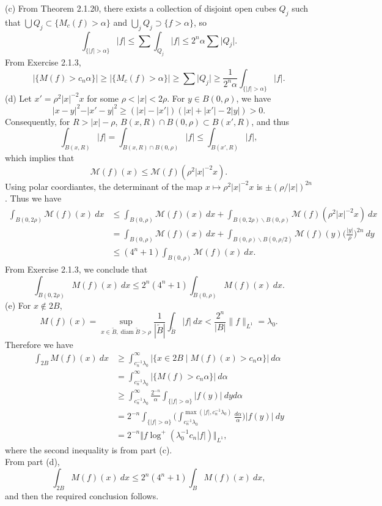 \begin{itemize}
(c) From Theorem 2.1.20, there exists a collection of disjoint open cubes $Q_j$ such that 
$\bigcup Q_j\subset\{M_c(f)>\alpha\}$ and $\bigcup_jQ_j\supset\{f>\alpha\}$, so
$$\int_{\{\vert f\vert>\alpha\}}\vert f\vert\leq\sum\int_{Q_j}\vert f\vert\leq 2^n\alpha\sum\vert Q_j\vert.$$
From Exercise 2.1.3,
$$\vert\{M(f)>c_n\alpha\}\vert\geq \vert\{M_c(f)>\alpha\}\vert
\geq \sum\vert Q_j\vert\geq\frac{1}{2^n\alpha}\int_{\{\vert f\vert>\alpha\}}\vert f\vert.$$
(d) Let $x'=\rho^2\vert x\vert^{-2}x$ for some $\rho<|x|<2\rho$. 
For $y\in B(0,\rho)$, we have $$\vert x-y\vert^2-\vert x'-y\vert ^2
\geq(|x|-|x'|)(|x|+|x'|-2|y|)>0.$$ 
Consequently, for $R>\vert x\vert-\rho$, $B(x,R)\cap B(0,\rho)
\subset B(x',R)$, and thus
$$\int_{B(x,R)}\vert f\vert=\int_{B(x,R)\cap B(0,\rho)}\vert f\vert 
\leq \int_{B(x',R)}\vert f\vert,$$
which implies that 
$$\mathcal{M}(f)(x)\leq\mathcal{M}(f)(\rho^2\vert x\vert^{-2}x).$$
Using polar coordiantes, the determinant of the map $x\mapsto
\rho^2\vert x\vert^{-2}x$ is $\pm(\rho/\vert x\vert)^{2n}$. Thus we have
\begin{align*}
\int_{B(0,2\rho)}\mathcal{M}(f)(x)\>dx
&\leq \int_{B(0,\rho)}\mathcal{M}(f)(x)\>dx+\int_{B(0,2\rho)\backslash B(0,\rho)}\mathcal{M}(f)(\rho^2|x|^{-2}x)\>dx\\
&=\int_{B(0,\rho)}\mathcal{M}(f)(x)\>dx+\int_{B(0,\rho)\backslash B(0,\rho/2)}\mathcal{M}(f)(y)\Big(\frac{|y|}{\rho}\Big)^{2n}\>dy\\
&\leq (4^n+1)\int_{B(0,\rho)}\mathcal{M}(f)(x)\>dx.
\end{align*}
From Exercise 2.1.3, we conclude that 
$$\int_{B(0,2\rho)}M(f)(x)\>dx\leq2^n(4^n+1)\int_{B(0,\rho)}M(f)(x)\>dx.$$
(e) For $x\notin 2B$,
$$M(f)(x)=\sup_{x\in\widetilde{B},\operatorname{diam} \widetilde{B}>\rho}
\frac1{|\widetilde{B}|}\int_{\widetilde{B}}|f|\>dx<\frac{2^n}{|B|}\|f\|_{L^1}=\lambda_0.$$
Therefore we have
\begin{align*}
\int_{2B}M(f)(x)\>dx
&\geq \int_{c_n^{-1}\lambda_0}^{\infty}\vert\{x\in 2B\mid M(f)(x)>c_n\alpha\}\vert\>d\alpha\\
&=\int_{c_n^{-1}\lambda_0}^{\infty}\vert\{ M(f)>c_n\alpha\}\vert\>d\alpha\\
&\geq \int_{c_n^{-1}\lambda_0}^{\infty}\frac{2^{-n}}{\alpha}\int_{\{\vert f\vert>\alpha\}}\vert f(y)\vert\>dyd\alpha\\
&= 2^{-n}\int_{\{\vert f\vert>\alpha\}}\bigg(\int_{c_n^{-1}\lambda_0}^{\max(|f|,c_n^{-1}\lambda_0)}\frac{d\alpha}{\alpha}\bigg)\vert f(y)\vert\>dy\\
&= 2^{-n}\Vert f\log^+(\lambda_0^{-1}c_n\vert f\vert)\Vert_{L^1},
\end{align*}
where the second inequality is from part (c).\\
From part (d), $$\int_{2B}M(f)(x)\>dx\leq2^n(4^n+1)\int_{B}M(f)(x)\>dx,$$
and then the required conclusion follows.


\end{itemize}
